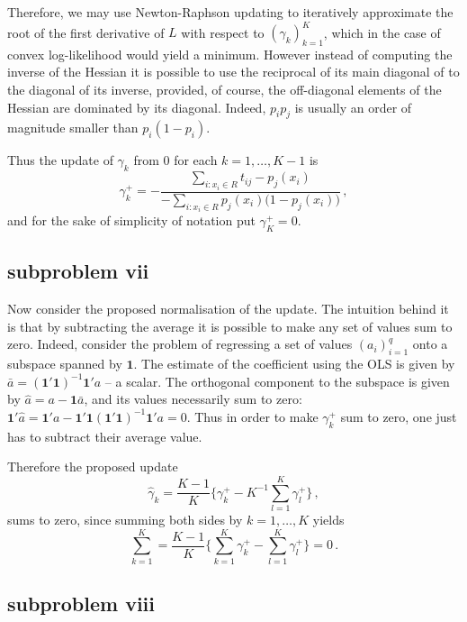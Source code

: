 \documentclass[a4paper]{article}
\newcommand{\one}{\mathbf{1}}
\begin{document}
Therefore, we may use Newton-Raphson updating to iteratively approximate the root of
the first derivative of $L$ with respect to $(\gamma_k)_{k=1}^K$, which in the case of
convex log-likelihood would yield a minimum. However instead of computing the inverse
of the Hessian it is possible to use the reciprocal of its main diagonal of to the diagonal
of its inverse, provided, of course, the off-diagonal elements of the Hessian are
dominated by its diagonal. Indeed, $p_i p_j$ is usually an order of magnitude smaller
than $p_i (1-p_i)$.

Thus the update of $\gamma_k$ from $0$ for each $k=1,\ldots, K-1$ is
\[
\gamma_k^+ = - \frac{ \sum_{i:x_i\in R} t_{ij} - p_j(x_i) }{- \sum_{i:x_i\in R} p_j(x_i) \bigl(1 - p_j(x_i)\bigr)}\,,
\]
and for the sake of simplicity of notation put $\gamma_K^+ = 0$.


\subsection{subproblem vii} %
\label{sub:subproblem_vii}

Now consider the proposed normalisation of the update. The intuition behind it is
that by subtracting the average it is possible to make any set of values sum to
zero. Indeed, consider the problem of regressing a set of values $(a_i)_{i=1}^q$
onto a subspace spanned by $\one$. The estimate of the coefficient using the OLS
is given by $\bar{a} = (\one'\one)^{-1} \one'a$ -- a scalar. The orthogonal component
to the subspace is given by $\hat{a} = a - \one \bar{a}$, and its values necessarily
sum to zero: $\one'\hat{a} = \one' a - \one'\one (\one'\one)^{-1} \one'a = 0$.
Thus in order to make $\gamma_k^+$ sum to zero, one just has to subtract their
average value.

Therefore the proposed update
\[
\hat{\gamma}_k = \frac{K-1}{K}\biggl\{ \gamma_k^+ - K^{-1} \sum_{l=1}^K \gamma_l^+ \biggr\} \,,
\]
sums to zero, since summing both sides by $k=1,\ldots, K$ yields
\[
\sum_{k=1}^K = \frac{K-1}{K} \biggl\{ \sum_{k=1}^K \gamma_k^+ - \sum_{l=1}^K \gamma_l^+ \biggr\} = 0\,.
\]


\subsection{subproblem viii} %
\label{sub:subproblem_viii}
\end{document}
